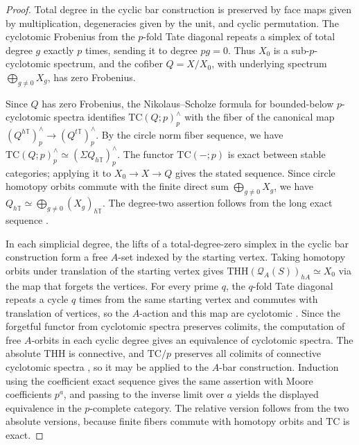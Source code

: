 \begin{proof}
Total degree in the cyclic bar construction is preserved by face maps given by multiplication, degeneracies given by the unit, and cyclic permutation.
The cyclotomic Frobenius from the $p$-fold Tate diagonal repeats a simplex of total degree $g$ exactly $p$ times, sending it to degree $pg=0$.
Thus $X_0$ is a sub-$p$-cyclotomic spectrum, and the cofiber $Q=X/X_0$, with underlying spectrum $\bigoplus_{g\ne0}X_g$, has zero Frobenius.

Since $Q$ has zero Frobenius, the Nikolaus--Scholze formula for bounded-below $p$-cyclotomic spectra identifies $\mathrm{TC}(Q;p)^\wedge_p$ with the fiber of the canonical map $(Q^{h\mathbb T})^\wedge_p\to(Q^{t\mathbb T})^\wedge_p$.
By the circle norm fiber sequence, we have $\mathrm{TC}(Q;p)^\wedge_p\simeq(\Sigma Q_{h\mathbb T})^\wedge_p$.
The functor $\mathrm{TC}(-;p)$ is exact between stable categories; applying it to $X_0\to X\to Q$ gives the stated sequence.
Since circle homotopy orbits commute with the finite direct sum $\bigoplus_{g\ne0}X_g$, we have $Q_{h\mathbb T}\simeq\bigoplus_{g\ne0}(X_g)_{h\mathbb T}$.
The degree-two assertion follows from the long exact sequence \cite[Proposition II.1.9, Lemma II.4.2]{NikolausScholzeTC}.

In each simplicial degree, the lifts of a total-degree-zero simplex in the cyclic bar construction form a free $A$-set indexed by the starting vertex.
Taking homotopy orbits under translation of the starting vertex gives $\mathrm{THH}(\mathcal Q_A(S))_{hA}\simeq X_0$ via the map that forgets the vertices.
For every prime $q$, the $q$-fold Tate diagonal repeats a cycle $q$ times from the same starting vertex and commutes with translation of vertices, so the $A$-action and this map are cyclotomic \cite[Corollary II.1.7, \S III.2]{NikolausScholzeTC}.
Since the forgetful functor from cyclotomic spectra preserves colimits, the computation of free $A$-orbits in each cyclic degree gives an equivalence of cyclotomic spectra.
The absolute $\mathrm{THH}$ is connective, and $\mathrm{TC}/p$ preserves all colimits of connective cyclotomic spectra \cite[Theorem 2.7]{ClausenMathewMorrow}, so it may be applied to the $A$-bar construction.
Induction using the coefficient exact sequence gives the same assertion with Moore coefficients $p^a$, and passing to the inverse limit over $a$ yields the displayed equivalence in the $p$-complete category.
The relative version follows from the two absolute versions, because finite fibers commute with homotopy orbits and $\mathrm{TC}$ is exact.
\end{proof}

